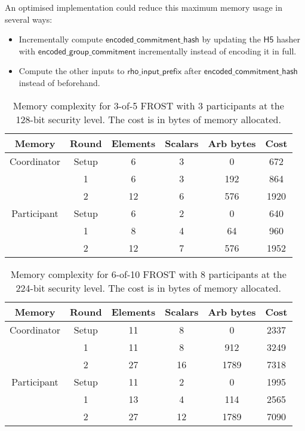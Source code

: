 An optimised implementation could reduce this maximum memory usage in several
ways:

\begin{itemize}
	\item Incrementally compute $\mathsf{encoded\_commitment\_hash}$ by updating
	the $\mathsf{H5}$ hasher with $\mathsf{encoded\_group\_commitment}$
	incrementally instead of encoding it in full.
	\item Compute the other inputs to $\mathsf{rho\_input\_prefix}$ after
	$\mathsf{encoded\_commitment\_hash}$ instead of beforehand.
\end{itemize}

\begin{table}
	\centering
	\begin{tabular}{c c c c c c}
		\toprule
		Memory & Round & Elements & Scalars & Arb bytes & Cost \\ \midrule
		Coordinator & Setup & 6 & 3 & 0 & 672 \\
		            & 1 & 6 & 3 & 192 & 864 \\
		            & 2 & 12 & 6 & 576 & 1920 \\
		\midrule
		Participant & Setup & 6 & 2 & 0 & 640 \\
		            & 1 & 8 & 4 & 64 & 960 \\
		            & 2 & 12 & 7 & 576 & 1952 \\
		\bottomrule
	\end{tabular}
	\caption{Memory complexity for 3-of-5 FROST with 3 participants at the 128-bit security level. The cost is in bytes of memory allocated.}
\end{table}

\begin{table}
	\centering
	\begin{tabular}{c c c c c c}
		\toprule
		Memory & Round & Elements & Scalars & Arb bytes & Cost \\ \midrule
		Coordinator & Setup & 11 & 8 & 0 & 2337 \\
		            & 1 & 11 & 8 & 912 & 3249 \\
		            & 2 & 27 & 16 & 1789 & 7318 \\
		\midrule
		Participant & Setup & 11 & 2 & 0 & 1995 \\
		            & 1 & 13 & 4 & 114 & 2565 \\
		            & 2 & 27 & 12 & 1789 & 7090 \\
		\bottomrule
	\end{tabular}
	\caption{Memory complexity for 6-of-10 FROST with 8 participants at the 224-bit security level. The cost is in bytes of memory allocated.}
\end{table}

